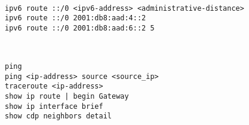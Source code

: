 \documentclass[../EngineeringJournal_CDavis.tex]{subfiles}
\begin{document}


\hspace{0.2cm}
\begin{tcolorbox}[width=6.3in]
\scriptsize
\begin{verbatim}

ipv6 route ::/0 <ipv6-address> <administrative-distance>
ipv6 route ::/0 2001:db8:aad:4::2
ipv6 route ::/0 2001:db8:aad:6::2 5


\end{verbatim}
\normalsize
\end{tcolorbox}
\hspace{0.2cm}



\hspace{0.2cm}
\begin{tcolorbox}[width=6.3in]
\scriptsize
\begin{verbatim}

ping
ping <ip-address> source <source_ip>
traceroute <ip-address>
show ip route | begin Gateway
show ip interface brief
show cdp neighbors detail


\end{verbatim}
\normalsize
\end{tcolorbox}
\hspace{0.2cm}

\newpage

\end{document}
